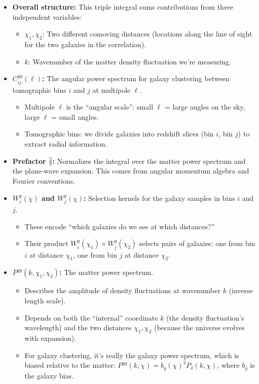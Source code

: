 \begin{itemize}[leftmargin=1.5cm]
    \item \textbf{Overall structure:} This triple integral sums contributions from three independent variables:
    \begin{itemize}
        \item $\chi_1, \chi_2$: Two different comoving distances (locations along the line of sight for the two galaxies in the correlation).
        \item $k$: Wavenumber of the matter density fluctuation we're measuring.
    \end{itemize}

    \item \textbf{$C^{gg}_{ij}(\ell)$:} The angular power spectrum for galaxy clustering between tomographic bins $i$ and $j$ at multipole $\ell$. 
    \begin{itemize}
        \item Multipole $\ell$ is the ``angular scale'': small $\ell$ = large angles on the sky, large $\ell$ = small angles.
        \item Tomographic bins: we divide galaxies into redshift slices (bin $i$, bin $j$) to extract radial information.
    \end{itemize}

    \item \textbf{Prefactor $\frac{2}{\pi}$:} Normalizes the integral over the matter power spectrum and the plane-wave expansion. This comes from angular momentum algebra and Fourier conventions.

    \item \textbf{$W^g_i(\chi)$ and $W^g_j(\chi)$:} Selection kernels for the galaxy samples in bins $i$ and $j$.
    \begin{itemize}
        \item These encode ``which galaxies do we see at which distances?''
        \item Their product $W^g_i(\chi_1) \times W^g_j(\chi_2)$ selects pairs of galaxies: one from bin $i$ at distance $\chi_1$, one from bin $j$ at distance $\chi_2$.
    \end{itemize}

    \item \textbf{$P^{gg}(k,\chi_1,\chi_2)$:} The matter power spectrum.
    \begin{itemize}
        \item Describes the amplitude of density fluctuations at wavenumber $k$ (inverse length scale).
        \item Depends on both the ``internal'' coordinate $k$ (the density fluctuation's wavelength) and the two distances $\chi_1,\chi_2$ (because the universe evolves with expansion).
        \item For galaxy clustering, it's really the galaxy power spectrum, which is biased relative to the matter: $P^{gg}(k, \chi) = b_g(\chi)^2 P_\delta(k,\chi)$, where $b_g$ is the galaxy bias.
    \end{itemize}


\end{itemize}
